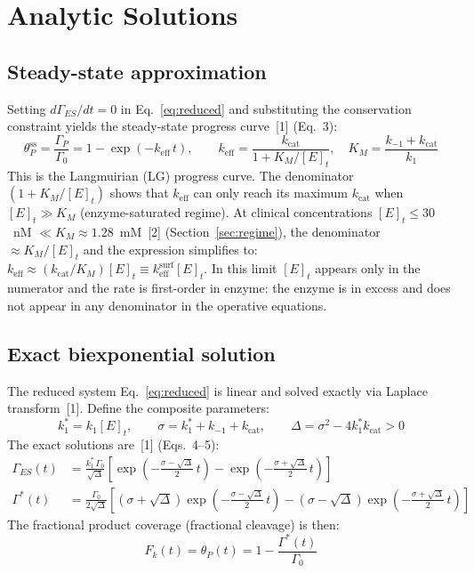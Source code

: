 \documentclass[10pt,a4paper]{article}
\numberwithin{equation}{section}
\newcommand{\cit}[1]{[#1]}
\newcommand{\kcat}{k_{\text{cat}}}
\newcommand{\keff}{k_{\text{eff}}}
\newcommand{\GES}{\Gamma_{ES}}
\newcommand{\GP}{\Gamma_P}
\newcommand{\Gstar}{\Gamma^{*}}
\newcommand{\Gz}{\Gamma_0}
\begin{document}
\section{Analytic Solutions}
\label{sec:analytic}

\subsection{Steady-state approximation}

Setting $d\GES/dt = 0$ in Eq.~\eqref{eq:reduced} and substituting the conservation
constraint yields the steady-state progress curve~\cit{1} (Eq.~3):
\begin{equation}
  \label{eq:ss}
  \theta_P^{\text{ss}} = \frac{\GP}{\Gz} = 1 - \exp(-\keff\,t), \qquad
  \keff = \frac{\kcat}{1 + K_M/[E]_t}, \quad
  K_M = \frac{k_{-1} + \kcat}{k_1}
\end{equation}
This is the Langmuirian (LG) progress curve. The denominator
$(1 + K_M/[E]_t)$ shows that $\keff$ can only reach its maximum $\kcat$
when $[E]_t \gg K_M$ (enzyme-saturated regime). At clinical concentrations
$[E]_t \leq 30$~nM $\ll K_M \approx 1.28$~mM~\cit{2} (Section~\ref{sec:regime}),
the denominator $\approx K_M/[E]_t$ and the expression simplifies to:
$\keff \approx (\kcat/K_M)[E]_t \equiv \keff^{\text{surf}}[E]_t$. In this limit
$[E]_t$ appears only in the numerator and the rate is first-order in enzyme:
the enzyme is in excess and does not appear in any denominator in the
operative equations.

\subsection{Exact biexponential solution}

The reduced system Eq.~\eqref{eq:reduced} is linear and solved exactly via Laplace
transform~\cit{1}. Define the composite parameters:
\begin{equation}
  \label{eq:composite}
  k_1^* = k_1[E]_t, \qquad
  \sigma = k_1^* + k_{-1} + \kcat, \qquad
  \Delta = \sigma^2 - 4k_1^*\kcat > 0
\end{equation}
The exact solutions are~\cit{1} (Eqs.~4--5):
\begin{align}
  \GES(t) &= \frac{k_1^*\,\Gz}{\sqrt{\Delta}}
    \left[\exp\!\left(-\frac{\sigma-\sqrt{\Delta}}{2}\,t\right)
         -\exp\!\left(-\frac{\sigma+\sqrt{\Delta}}{2}\,t\right)\right]
  \label{eq:Ges} \\[0.5em]
  \Gstar(t) &= \frac{\Gz}{2\sqrt{\Delta}}
    \left[(\sigma+\sqrt{\Delta})\exp\!\left(-\frac{\sigma-\sqrt{\Delta}}{2}\,t\right)
         -(\sigma-\sqrt{\Delta})\exp\!\left(-\frac{\sigma+\sqrt{\Delta}}{2}\,t\right)\right]
  \label{eq:Gstar}
\end{align}
The fractional product coverage (fractional cleavage) is then:
\begin{equation}
  \label{eq:Fk_biexp}
  F_k(t) = \theta_P(t) = 1 - \frac{\Gstar(t)}{\Gz}
\end{equation}
\end{document}
